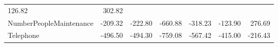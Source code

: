 \documentclass[]{article}
\begin{document}
\begin{longtable}[]{@{}lrrrrrr@{}}
\begin{minipage}[t]{0.08\columnwidth}
126.82\strut
\end{minipage} & \begin{minipage}[t]{0.08\columnwidth}\raggedleft\strut
302.82\strut
\end{minipage}\tabularnewline
\begin{minipage}[t]{0.31\columnwidth}\raggedright\strut
NumberPeopleMaintenance\strut
\end{minipage} & \begin{minipage}[t]{0.10\columnwidth}\raggedleft\strut
-209.32\strut
\end{minipage} & \begin{minipage}[t]{0.08\columnwidth}\raggedleft\strut
-222.80\strut
\end{minipage} & \begin{minipage}[t]{0.08\columnwidth}\raggedleft\strut
-660.88\strut
\end{minipage} & \begin{minipage}[t]{0.08\columnwidth}\raggedleft\strut
-318.23\strut
\end{minipage} & \begin{minipage}[t]{0.08\columnwidth}\raggedleft\strut
-123.90\strut
\end{minipage} & \begin{minipage}[t]{0.08\columnwidth}\raggedleft\strut
276.69\strut
\end{minipage}\tabularnewline
\begin{minipage}[t]{0.31\columnwidth}\raggedright\strut
Telephone\strut
\end{minipage} & \begin{minipage}[t]{0.10\columnwidth}\raggedleft\strut
-496.50\strut
\end{minipage} & \begin{minipage}[t]{0.08\columnwidth}\raggedleft\strut
-494.30\strut
\end{minipage} & \begin{minipage}[t]{0.08\columnwidth}\raggedleft\strut
-759.08\strut
\end{minipage} & \begin{minipage}[t]{0.08\columnwidth}\raggedleft\strut
-567.42\strut
\end{minipage} & \begin{minipage}[t]{0.08\columnwidth}\raggedleft\strut
-415.00\strut
\end{minipage} & \begin{minipage}[t]{0.08\columnwidth}\raggedleft\strut
-216.43\strut
\end{minipage}\tabularnewline

\end{longtable}
\end{document}
